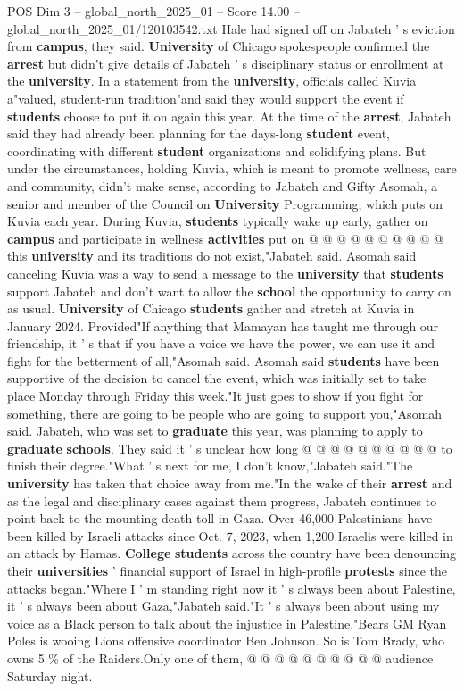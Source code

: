 \begin{textsample}{POS Dim 3 – global\_north\_2025\_01 – Score 14.00 – global\_north\_2025\_01/120103542.txt}
Hale had signed off on Jabateh ' s eviction from \textbf{campus}, they said. \textbf{University} of Chicago spokespeople confirmed the \textbf{arrest} but didn't give details of Jabateh ' s disciplinary status or enrollment at the \textbf{university}.
In a statement from the \textbf{university}, officials called Kuvia a"valued, student-run tradition"and said they would support the event if \textbf{students} choose to put it on again this year.
At the time of the \textbf{arrest}, Jabateh said they had already been planning for the days-long \textbf{student} event, coordinating with different \textbf{student} organizations and solidifying plans.
But under the circumstances, holding Kuvia, which is meant to promote wellness, care and community, didn't make sense, according to Jabateh and Gifty Asomah, a senior and member of the Council on \textbf{University} Programming, which puts on Kuvia each year.
During Kuvia, \textbf{students} typically wake up early, gather on \textbf{campus} and participate in wellness \textbf{activities} put on @ @ @ @ @ @ @ @ @ @ this \textbf{university} and its traditions do not exist,"Jabateh said.
Asomah said canceling Kuvia was a way to send a message to the \textbf{university} that \textbf{students} support Jabateh and don't want to allow the \textbf{school} the opportunity to carry on as usual. \textbf{University} of Chicago \textbf{students} gather and stretch at Kuvia in January 2024.
Provided"If anything that Mamayan has taught me through our friendship, it ' s that if you have a voice we have the power, we can use it and fight for the betterment of all,"Asomah said.
Asomah said \textbf{students} have been supportive of the decision to cancel the event, which was initially set to take place Monday through Friday this week."It just goes to show if you fight for something, there are going to be people who are going to support you,"Asomah said.
Jabateh, who was set to \textbf{graduate} this year, was planning to apply to \textbf{graduate} \textbf{schools}.
They said it ' s unclear how long @ @ @ @ @ @ @ @ @ @ to finish their degree."What ' s next for me, I don't know,"Jabateh said."The \textbf{university} has taken that choice away from me."In the wake of their \textbf{arrest} and as the legal and disciplinary cases against them progress, Jabateh continues to point back to the mounting death toll in Gaza.
Over 46,000 Palestinians have been killed by Israeli attacks since Oct. 7, 2023, when 1,200 Israelis were killed in an attack by Hamas. \textbf{College} \textbf{students} across the country have been denouncing their \textbf{universities} ' financial support of Israel in high-profile \textbf{protests} since the attacks began."Where I ' m standing right now it ' s always been about Palestine, it ' s always been about Gaza,"Jabateh said."It ' s always been about using my voice as a Black person to talk about the injustice in Palestine."Bears GM Ryan Poles is wooing Lions offensive coordinator Ben Johnson.
So is Tom Brady, who owns 5 \% of the Raiders.Only one of them, @ @ @ @ @ @ @ @ @ @ audience Saturday night.


\end{textsample}
